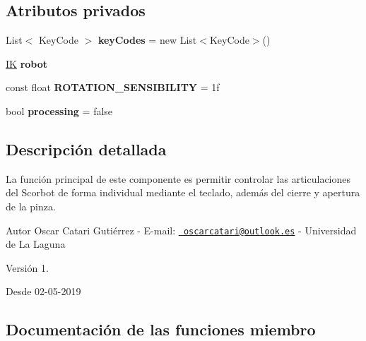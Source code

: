 \subsection*{Atributos privados}
\begin{DoxyCompactItemize}
\item 
\mbox{\label{class_manual_input_control_ac2bddcd756766ed8b4ab9fb4c5a432e9}} 
List$<$ Key\+Code $>$ {\bfseries key\+Codes} = new List$<$Key\+Code$>$()
\item 
\mbox{\label{class_manual_input_control_ad52ab70411ec88c87a534d015cb66479}} 
\mbox{\hyperlink{class_i_k}{IK}} {\bfseries robot}
\item 
\mbox{\label{class_manual_input_control_a7936611cdab48f04f0f46132968cd5e5}} 
const float {\bfseries R\+O\+T\+A\+T\+I\+O\+N\+\_\+\+S\+E\+N\+S\+I\+B\+I\+L\+I\+TY} = 1f
\item 
\mbox{\label{class_manual_input_control_ae2d33a6e78702f6ada4354990f7ebf35}} 
bool {\bfseries processing} = false
\end{DoxyCompactItemize}


\subsection{Descripción detallada}
La función principal de este componente es permitir controlar las articulaciones del Scorbot de forma individual mediante el teclado, además del cierre y apertura de la pinza. \begin{DoxyAuthor}{Autor}
Oscar Catari Gutiérrez -\/ E-\/mail\+: \href{mailto:oscarcatari@outlook.es}{\texttt{ oscarcatari@outlook.\+es}} -\/ Universidad de La Laguna 
\end{DoxyAuthor}
\begin{DoxyVersion}{Versión}
1. 
\end{DoxyVersion}
\begin{DoxySince}{Desde}
02-\/05-\/2019 
\end{DoxySince}


\subsection{Documentación de las funciones miembro}
\mbox{\label{class_manual_input_control_a00de8f95d74cefb32806a4262fd90aba}} 
